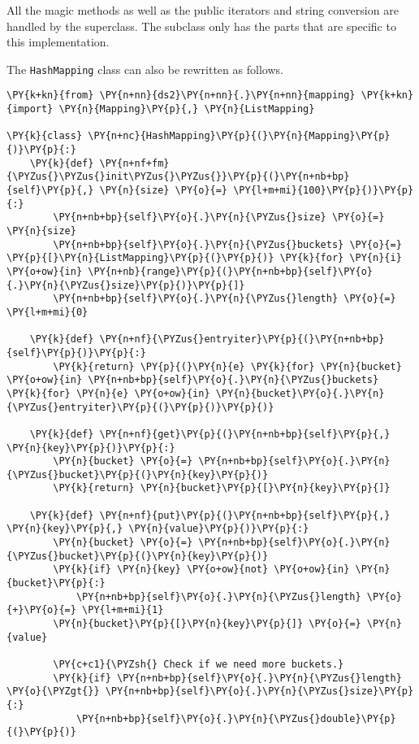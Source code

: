 All the magic methods as well as the public iterators and string conversion are handled by the superclass.  The subclass only has the parts that are specific to this implementation.


The \texttt{HashMapping} class can also be rewritten as follows.

\begin{Verbatim}[commandchars=\\\{\}]
\PY{k+kn}{from} \PY{n+nn}{ds2}\PY{n+nn}{.}\PY{n+nn}{mapping} \PY{k+kn}{import} \PY{n}{Mapping}\PY{p}{,} \PY{n}{ListMapping}

\PY{k}{class} \PY{n+nc}{HashMapping}\PY{p}{(}\PY{n}{Mapping}\PY{p}{)}\PY{p}{:}
    \PY{k}{def} \PY{n+nf+fm}{\PYZus{}\PYZus{}init\PYZus{}\PYZus{}}\PY{p}{(}\PY{n+nb+bp}{self}\PY{p}{,} \PY{n}{size} \PY{o}{=} \PY{l+m+mi}{100}\PY{p}{)}\PY{p}{:}
        \PY{n+nb+bp}{self}\PY{o}{.}\PY{n}{\PYZus{}size} \PY{o}{=} \PY{n}{size}
        \PY{n+nb+bp}{self}\PY{o}{.}\PY{n}{\PYZus{}buckets} \PY{o}{=} \PY{p}{[}\PY{n}{ListMapping}\PY{p}{(}\PY{p}{)} \PY{k}{for} \PY{n}{i} \PY{o+ow}{in} \PY{n+nb}{range}\PY{p}{(}\PY{n+nb+bp}{self}\PY{o}{.}\PY{n}{\PYZus{}size}\PY{p}{)}\PY{p}{]}
        \PY{n+nb+bp}{self}\PY{o}{.}\PY{n}{\PYZus{}length} \PY{o}{=} \PY{l+m+mi}{0}

    \PY{k}{def} \PY{n+nf}{\PYZus{}entryiter}\PY{p}{(}\PY{n+nb+bp}{self}\PY{p}{)}\PY{p}{:}
        \PY{k}{return} \PY{p}{(}\PY{n}{e} \PY{k}{for} \PY{n}{bucket} \PY{o+ow}{in} \PY{n+nb+bp}{self}\PY{o}{.}\PY{n}{\PYZus{}buckets} \PY{k}{for} \PY{n}{e} \PY{o+ow}{in} \PY{n}{bucket}\PY{o}{.}\PY{n}{\PYZus{}entryiter}\PY{p}{(}\PY{p}{)}\PY{p}{)}

    \PY{k}{def} \PY{n+nf}{get}\PY{p}{(}\PY{n+nb+bp}{self}\PY{p}{,} \PY{n}{key}\PY{p}{)}\PY{p}{:}
        \PY{n}{bucket} \PY{o}{=} \PY{n+nb+bp}{self}\PY{o}{.}\PY{n}{\PYZus{}bucket}\PY{p}{(}\PY{n}{key}\PY{p}{)}
        \PY{k}{return} \PY{n}{bucket}\PY{p}{[}\PY{n}{key}\PY{p}{]}

    \PY{k}{def} \PY{n+nf}{put}\PY{p}{(}\PY{n+nb+bp}{self}\PY{p}{,} \PY{n}{key}\PY{p}{,} \PY{n}{value}\PY{p}{)}\PY{p}{:}
        \PY{n}{bucket} \PY{o}{=} \PY{n+nb+bp}{self}\PY{o}{.}\PY{n}{\PYZus{}bucket}\PY{p}{(}\PY{n}{key}\PY{p}{)}
        \PY{k}{if} \PY{n}{key} \PY{o+ow}{not} \PY{o+ow}{in} \PY{n}{bucket}\PY{p}{:}
            \PY{n+nb+bp}{self}\PY{o}{.}\PY{n}{\PYZus{}length} \PY{o}{+}\PY{o}{=} \PY{l+m+mi}{1}
        \PY{n}{bucket}\PY{p}{[}\PY{n}{key}\PY{p}{]} \PY{o}{=} \PY{n}{value}

        \PY{c+c1}{\PYZsh{} Check if we need more buckets.}
        \PY{k}{if} \PY{n+nb+bp}{self}\PY{o}{.}\PY{n}{\PYZus{}length} \PY{o}{\PYZgt{}} \PY{n+nb+bp}{self}\PY{o}{.}\PY{n}{\PYZus{}size}\PY{p}{:}
            \PY{n+nb+bp}{self}\PY{o}{.}\PY{n}{\PYZus{}double}\PY{p}{(}\PY{p}{)}


\end{Verbatim}

